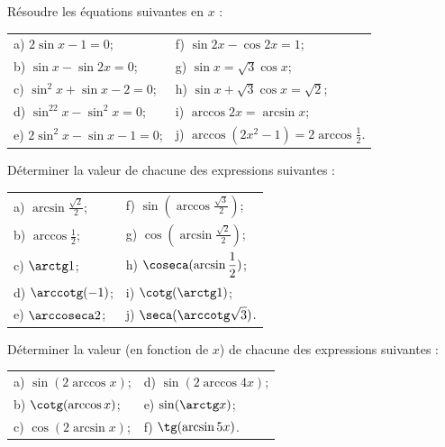 \documentclass[12pt,french,oneside,a4paper]{memoir} %
\begin{document}
\begin{exo}
Résoudre les équations suivantes en $x$ :
  
\begin{tabular}{ll}
  a) $\displaystyle{2\sin x-1=0}$;\qquad\qquad         & f) $\displaystyle{\sin 2x-\cos 2x=1}$;            \\[2mm]
  b) $\displaystyle{\sin x-\sin 2x=0}$;\qquad\qquad    & g) $\displaystyle{\sin x=\sqrt 3\cos x}$;         \\[2mm]
  c) $\displaystyle{\sin^2x+\sin x-2=0}$;\qquad\qquad  & h) $\displaystyle{\sin x+\sqrt 3\cos x=\sqrt 2}$; \\[2mm]
  d) $\displaystyle{\sin^22x-\sin^2x=0}$;\qquad\qquad  & i) $\displaystyle{\arccos 2x=\arcsin x}$;         \\[2mm]
  e) $\displaystyle{2\sin^2x-\sin x-1=0}$;\qquad\qquad & j) $\displaystyle{\arccos(2x^2-1)=2\arccos\frac{1}{2}}$.
\end{tabular}
\end{exo}
\begin{exo}
Déterminer la valeur de chacune des expressions suivantes :
  
  \begin{tabular}{ll}
  a) $\displaystyle{\arcsin\frac{\sqrt 2}{2}}$;\qquad\qquad&
  f) $\displaystyle{\sin(\arccos\frac{\sqrt 3}{2})}$;\\[2mm]
  b) $\displaystyle{\arccos\frac{1}{2}}$;\qquad\qquad&
  g) $\displaystyle{\cos(\arcsin\frac{\sqrt 2}{2})}$;\\[2mm]
  c) $\displaystyle{\arctg 1}$;\qquad\qquad&
  h) $\displaystyle{\coseca(\arcsin\frac{1}{2})}$;\\[2mm]
  d) $\displaystyle{\arccotg(-1)}$;\qquad\qquad&
  i) $\displaystyle{\cotg(\arctg 1)}$;\\[2mm]
  e) $\displaystyle{}\arccoseca 2$;\qquad\qquad&
  j) $\displaystyle{\seca(\arccotg \sqrt 3)}$.
  \end{tabular}
\end{exo}
\begin{exo}
Déterminer la valeur (en fonction de $x$) de chacune des
  expressions suivantes :
  
  \begin{tabular}{ll}
  a) $\displaystyle{\sin(2\arccos x)}$;\qquad\qquad&
  d) $\displaystyle{\sin(2\arccos 4x)}$;\\[2mm]
  b) $\displaystyle{\cotg(\arccos x)}$;\qquad\qquad&
  e) $\displaystyle{\sin(\arctg x)}$;\\[2mm]
  c) $\displaystyle{\cos(2\arcsin x)}$;\qquad\qquad&
  f) $\displaystyle{\tg(\arcsin 5x)}$.
  \end{tabular}
\end{exo}
\end{document}
